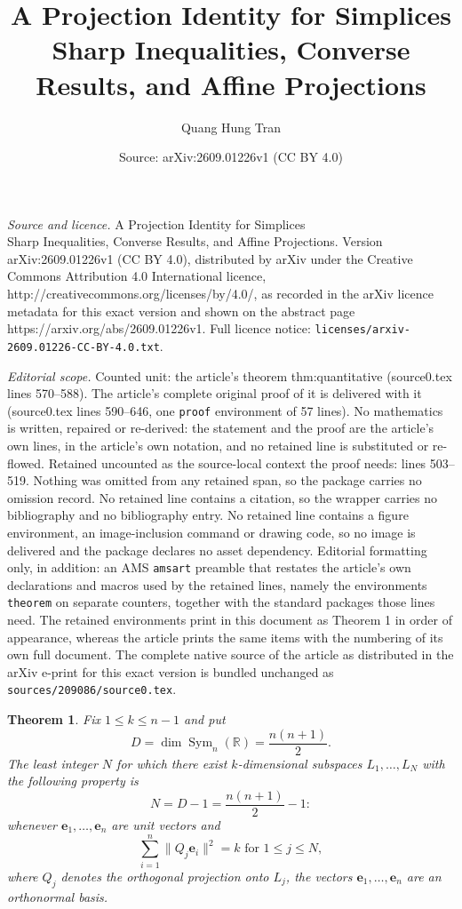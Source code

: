 \documentclass[10pt,a4paper]{amsart}
\title{A Projection Identity for Simplices\\ Sharp Inequalities, Converse Results, and Affine Projections}
\author{Quang Hung Tran}
\date{Source: arXiv:2609.01226v1 (CC BY 4.0)}
\newtheorem{theorem}{Theorem}
\newcommand{\R}{\mathbb{R}}
\newcommand{\be}{\mathbf e}
\newcommand{\norm}[1]{\lVert #1 \rVert}
\begin{document}
\maketitle

\noindent\emph{Source and licence.} A Projection Identity for Simplices\\ Sharp Inequalities, Converse Results, and Affine Projections. Version arXiv:2609.01226v1 (CC BY 4.0), distributed by arXiv under the Creative Commons Attribution 4.0 International licence, http://creativecommons.org/licenses/by/4.0/, as recorded in the arXiv licence metadata for this exact version and shown on the abstract page https://arxiv.org/abs/2609.01226v1. Full licence notice: \texttt{licenses/arxiv-2609.01226-CC-BY-4.0.txt}.\par\smallskip

\noindent\textit{Editorial scope.} Counted unit: the article's theorem thm:quantitative (source0.tex lines 570--588). The article's complete original proof of it is delivered with it (source0.tex lines 590--646, one \texttt{proof} environment of 57 lines). No mathematics is written, repaired or re-derived: the statement and the proof are the article's own lines, in the article's own notation, and no retained line is substituted or re-flowed.  Retained uncounted as the source-local context the proof needs: lines 503--519.  Nothing was omitted from any retained span, so the package carries no omission record.  No retained line contains a citation, so the wrapper carries no bibliography and no bibliography entry.  No retained line contains a figure environment, an image-inclusion command or drawing code, so no image is delivered and the package declares no asset dependency.  Editorial formatting only, in addition: an AMS \texttt{amsart} preamble that restates the article's own declarations and macros used by the retained lines, namely the environments \texttt{theorem} on separate counters, together with the standard packages those lines need.  The retained environments print in this document as Theorem 1 in order of appearance, whereas the article prints the same items with the numbering of its own full document.  The complete native source of the article as distributed in the arXiv e-print for this exact version is bundled unchanged as \texttt{sources/209086/source0.tex}.
\begin{theorem}\label{prop:howmany}
Fix $1\le k\le n-1$ and put
\[
D=\dim\operatorname{Sym}_n(\R)=\frac{n(n+1)}2.
\]
The least integer $N$ for which there exist $k$-dimensional subspaces
$L_1,\ldots,L_N$ with the following property is
\[
N=D-1=\frac{n(n+1)}2-1:
\]
whenever $\be_1,\ldots,\be_n$ are unit vectors and
\[
\sum_{i=1}^{n}\norm{Q_j\be_i}^2=k \text{ for } 1\le j\le N,
\]
where $Q_j$ denotes the orthogonal projection onto $L_j$, the vectors
$\be_1,\ldots,\be_n$ are an orthonormal basis.
\end{theorem}
\end{document}
